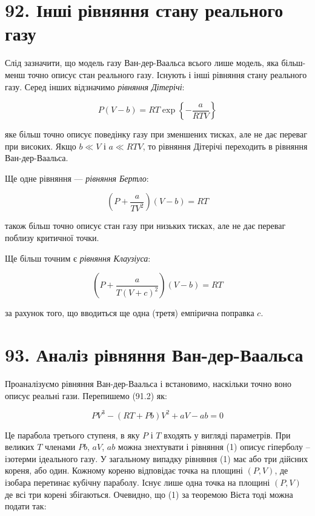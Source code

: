 \documentclass{article}
\begin{document}
\section*{92. Інші рівняння стану реального газу}

Слід зазначити, що модель газу Ван-дер-Ваальса всього лише модель, яка більш-менш точно описує стан
реального газу. Існують і інші рівняння стану реального газу. Серед інших відзначимо \emph{рівняння
Дітерічі}:

\begin{equation}
P(V - b) = RT\exp\left\{ - \frac{a}{RTV} \right\}
\label{eq:92.1}
\end{equation}

яке більш точно описує поведінку газу при зменшених тисках, але не дає переваг при високих. Якщо $b
\ll V$ і $a \ll RTV$, то рівняння Дітерічі переходить в рівняння Ван-дер-Ваальса.

Ще одне рівняння — \emph{рівняння Бертло}:

\begin{equation}
\left( P + \frac{a}{TV^{2}} \right)(V - b) = RT
\label{eq:92.2}
\end{equation}

також більш точно описує стан газу при низьких тисках, але не дає переваг поблизу критичної точки.

Ще більш точним є \emph{рівняння Клаузіуса}:

\begin{equation}
\left( P + \frac{a}{T(V + c)^{2}} \right)(V - b) = RT
\label{eq:92.3}
\end{equation}

за рахунок того, що вводиться ще одна (третя) емпірична поправка $c$.

\section*{93. Аналіз рівняння Ван-дер-Ваальса}

Проаналізуємо рівняння Ван-дер-Ваальса і встановимо, наскільки точно воно описує реальні гази.
Перепишемо (91.2) як:

\begin{equation}
PV^{3} - (RT + Pb)V^{2} + aV - ab = 0
\label{eq:93.1}
\end{equation}

Це парабола третього ступеня, в яку $P$ і $T$ входять у вигляді параметрів. При великих $T$ членами
$Pb$, $aV$, $ab$ можна знехтувати і рівняння (1) описує гіперболу -- ізотерми ідеального газу. У
загальному випадку рівняння (1) має або три дійсних кореня, або один. Кожному кореню відповідає точка
на площині $(P, V)$, де ізобара перетинає кубічну параболу. Існує лише одна точка на площині $(P, V)$
де всі три корені збігаються. Очевидно, що (1) за теоремою Вієта тоді можна подати так:
\end{document}
